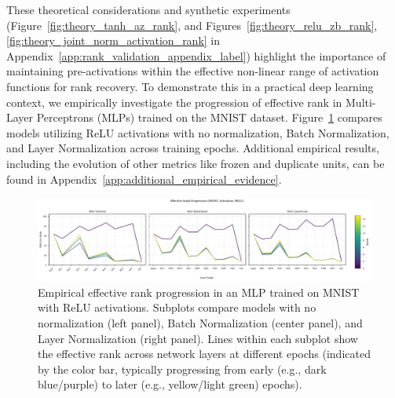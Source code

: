 \documentclass{article}
\begin{document}
These theoretical considerations and synthetic experiments (Figure~\ref{fig:theory_tanh_az_rank}, and Figures~\ref{fig:theory_relu_zb_rank}, \ref{fig:theory_joint_norm_activation_rank} in Appendix~\ref{app:rank_validation_appendix_label}) highlight the importance of maintaining pre-activations within the effective non-linear range of activation functions for rank recovery. 
To demonstrate this in a practical deep learning context, we empirically investigate the progression of effective rank in Multi-Layer Perceptrons (MLPs) trained on the MNIST dataset. Figure~\ref{fig:empirical_rank_progression} compares models utilizing ReLU activations with no normalization, Batch Normalization, and Layer Normalization across training epochs. Additional empirical results, including the evolution of other metrics like frozen and duplicate units, can be found in Appendix~\ref{app:additional_empirical_evidence}.



\begin{figure}[ht!]
    \centering
    \includegraphics[width=\textwidth]{figures/empirical_rank_progression_relu_mnist.pdf} 
    \caption{Empirical effective rank progression in an MLP trained on MNIST with ReLU activations. Subplots compare models with no normalization (left panel), Batch Normalization (center panel), and Layer Normalization (right panel). Lines within each subplot show the effective rank across network layers at different epochs (indicated by the color bar, typically progressing from early (e.g., dark blue/purple) to later (e.g., yellow/light green) epochs).}
    \label{fig:empirical_rank_progression}
\end{figure}
\end{document}
